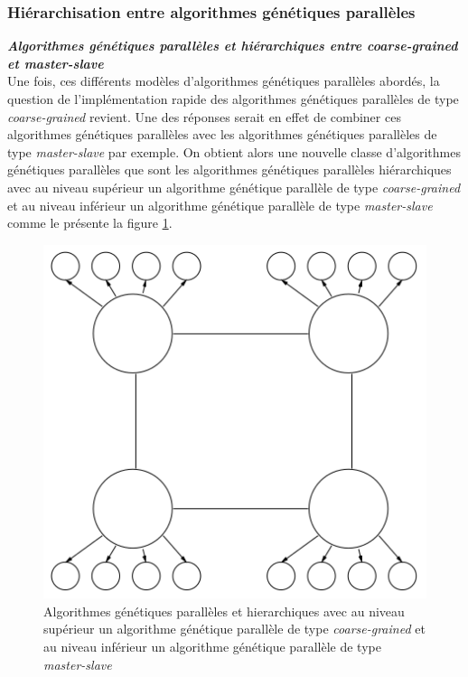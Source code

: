 	\subsubsection{Hiérarchisation entre algorithmes génétiques parallèles}{\label{sec:algo_hierarchique}}
	
	\textsl{\textbf{Algorithmes génétiques parallèles et hiérarchiques entre \emph{coarse-grained} et \emph{master-slave}}}\\
	
	\hspace*{.5cm} Une fois, ces différents modèles d'algorithmes génétiques parallèles abordés, la question de l'implémentation rapide des algorithmes génétiques parallèles de type \emph{coarse-grained }revient. Une des réponses serait en effet de combiner ces algorithmes génétiques parallèles avec les algorithmes génétiques parallèles de type \emph{master-slave} par exemple. On obtient alors une nouvelle classe d'algorithmes génétiques parallèles que sont les algorithmes génétiques parallèles hiérarchiques\cite{cant2} avec au niveau supérieur un algorithme génétique parallèle de type \emph{coarse-grained} et au niveau inférieur un algorithme génétique parallèle de type \emph{master-slave} comme le présente la figure \ref{fig:hierarchical_gene1_fig}. \\
 	
	\begin{figure}[!h]
		\begin{center}
			\includegraphics[scale=.3]{images/hierarchical_gene1_fig.png}
			\caption{Algorithmes génétiques parallèles et hierarchiques avec au niveau supérieur un algorithme génétique parallèle de type \emph{coarse-grained} et au niveau inférieur un algorithme génétique parallèle de type \emph{master-slave} \cite{cant2}}
			\label{fig:hierarchical_gene1_fig}
		\end{center}
	\end{figure} 	
	
